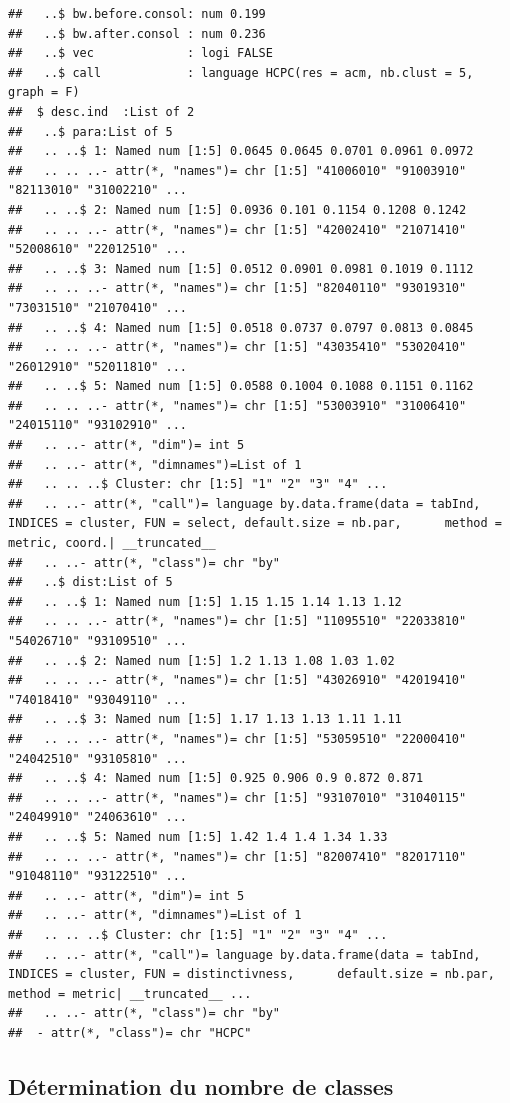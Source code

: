 \documentclass[]{book}
\begin{document}
\begin{verbatim}
##   ..$ bw.before.consol: num 0.199
##   ..$ bw.after.consol : num 0.236
##   ..$ vec             : logi FALSE
##   ..$ call            : language HCPC(res = acm, nb.clust = 5, graph = F)
##  $ desc.ind  :List of 2
##   ..$ para:List of 5
##   .. ..$ 1: Named num [1:5] 0.0645 0.0645 0.0701 0.0961 0.0972
##   .. .. ..- attr(*, "names")= chr [1:5] "41006010" "91003910" "82113010" "31002210" ...
##   .. ..$ 2: Named num [1:5] 0.0936 0.101 0.1154 0.1208 0.1242
##   .. .. ..- attr(*, "names")= chr [1:5] "42002410" "21071410" "52008610" "22012510" ...
##   .. ..$ 3: Named num [1:5] 0.0512 0.0901 0.0981 0.1019 0.1112
##   .. .. ..- attr(*, "names")= chr [1:5] "82040110" "93019310" "73031510" "21070410" ...
##   .. ..$ 4: Named num [1:5] 0.0518 0.0737 0.0797 0.0813 0.0845
##   .. .. ..- attr(*, "names")= chr [1:5] "43035410" "53020410" "26012910" "52011810" ...
##   .. ..$ 5: Named num [1:5] 0.0588 0.1004 0.1088 0.1151 0.1162
##   .. .. ..- attr(*, "names")= chr [1:5] "53003910" "31006410" "24015110" "93102910" ...
##   .. ..- attr(*, "dim")= int 5
##   .. ..- attr(*, "dimnames")=List of 1
##   .. .. ..$ Cluster: chr [1:5] "1" "2" "3" "4" ...
##   .. ..- attr(*, "call")= language by.data.frame(data = tabInd, INDICES = cluster, FUN = select, default.size = nb.par,      method = metric, coord.| __truncated__
##   .. ..- attr(*, "class")= chr "by"
##   ..$ dist:List of 5
##   .. ..$ 1: Named num [1:5] 1.15 1.15 1.14 1.13 1.12
##   .. .. ..- attr(*, "names")= chr [1:5] "11095510" "22033810" "54026710" "93109510" ...
##   .. ..$ 2: Named num [1:5] 1.2 1.13 1.08 1.03 1.02
##   .. .. ..- attr(*, "names")= chr [1:5] "43026910" "42019410" "74018410" "93049110" ...
##   .. ..$ 3: Named num [1:5] 1.17 1.13 1.13 1.11 1.11
##   .. .. ..- attr(*, "names")= chr [1:5] "53059510" "22000410" "24042510" "93105810" ...
##   .. ..$ 4: Named num [1:5] 0.925 0.906 0.9 0.872 0.871
##   .. .. ..- attr(*, "names")= chr [1:5] "93107010" "31040115" "24049910" "24063610" ...
##   .. ..$ 5: Named num [1:5] 1.42 1.4 1.4 1.34 1.33
##   .. .. ..- attr(*, "names")= chr [1:5] "82007410" "82017110" "91048110" "93122510" ...
##   .. ..- attr(*, "dim")= int 5
##   .. ..- attr(*, "dimnames")=List of 1
##   .. .. ..$ Cluster: chr [1:5] "1" "2" "3" "4" ...
##   .. ..- attr(*, "call")= language by.data.frame(data = tabInd, INDICES = cluster, FUN = distinctivness,      default.size = nb.par, method = metric| __truncated__ ...
##   .. ..- attr(*, "class")= chr "by"
##  - attr(*, "class")= chr "HCPC"
\end{verbatim}

\hypertarget{determination-du-nombre-de-classes}{%
\subsection{Détermination du nombre de classes}\label{determination-du-nombre-de-classes}}
\end{document}
